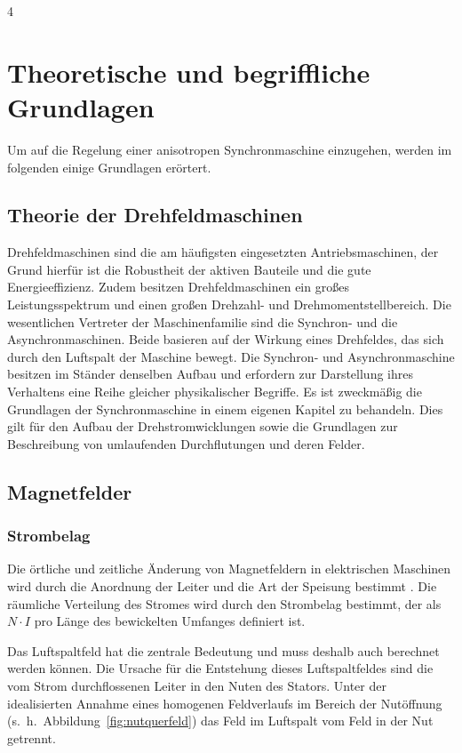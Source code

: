 4%

\chapter{Theoretische und begriffliche Grundlagen}\label{cha:grundlagen}

Um auf die Regelung einer anisotropen Synchronmaschine einzugehen, werden im folgenden einige Grundlagen erörtert.

\section{Theorie der Drehfeldmaschinen}\label{sec:grund-drehfeld}

Drehfeldmaschinen sind die am häufigsten eingesetzten Antriebsmaschinen, der Grund hierfür ist die Robustheit der aktiven Bauteile und die gute Energieeffizienz.
Zudem besitzen Drehfeldmaschinen ein großes Leistungsspektrum und einen großen Drehzahl- und Drehmomentstellbereich.
Die wesentlichen Vertreter der Maschinenfamilie sind die Synchron- und die Asynchronmaschinen.
Beide basieren auf der Wirkung eines Drehfeldes, das sich durch den Luftspalt der Maschine bewegt.
Die Synchron- und Asynchronmaschine besitzen im Ständer denselben Aufbau und erfordern zur Darstellung ihres Verhaltens eine Reihe gleicher physikalischer Begriffe.
Es ist zweckmäßig die Grundlagen der Synchronmaschine in einem eigenen Kapitel zu behandeln.
Dies gilt \insb für den Aufbau der Drehstromwicklungen sowie die Grundlagen zur Beschreibung von umlaufenden Durchflutungen und deren Felder.

\section{Magnetfelder}



\subsection{Strombelag}

Die örtliche und zeitliche Änderung von Magnetfeldern in elektrischen Maschinen wird durch die Anordnung der Leiter und die Art der Speisung bestimmt \autocite[S~199]{hofmann2013}.
Die räumliche Verteilung des Stromes wird durch den Strombelag bestimmt, der als $N\cdot I$ pro Länge des bewickelten Umfanges definiert ist.

Das Luftspaltfeld hat die zentrale Bedeutung und muss deshalb auch berechnet werden können.
Die Ursache für die Entstehung dieses Luftspaltfeldes sind die vom Strom durchflossenen Leiter in den Nuten des Stators.
Unter der idealisierten Annahme eines homogenen Feldverlaufs im Bereich der Nutöffnung (s.~h.~Abbildung~\ref{fig:nutquerfeld}) das Feld im Luftspalt vom Feld in der Nut getrennt.

